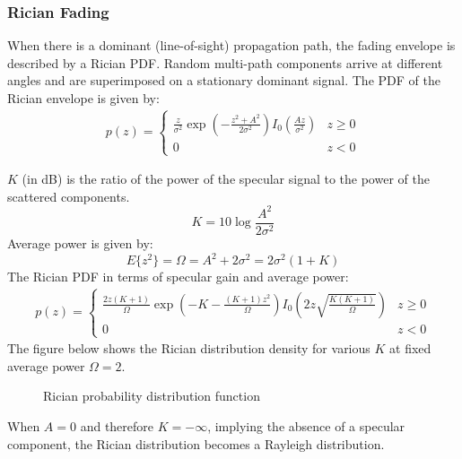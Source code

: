 \subsubsection{Rician Fading}
When there is a dominant (line-of-sight) propagation path, the fading envelope is described by a Rician \gls{PDF}\cite{AWGN}. Random multi-path components arrive at different angles and are superimposed on a stationary dominant signal. The \gls{PDF} of the Rician envelope is given by:
\begin{align}
	p(z) =
	\begin{cases}
		\frac{z}{\sigma^2} \exp \left(-\frac{z^2 + A^2}{2\sigma^2}\right)I_0\left(\frac{Az}{\sigma^2}\right) & z \geq 0 \\
		0 & z < 0
	\end{cases}
\end{align}
\begin{mathDef}
\end{mathDef}
\(K\) (in dB) is the ratio of the power of the specular signal to the power of the scattered components\cite{Hindu}.
\begin{equation}
	K = 10 \log \frac{A^2}{2\sigma^2}
\end{equation}
Average power is given by:
\begin{equation}
	E\{z^2\} = \Omega = A^2 + 2\sigma^2 = 2\sigma^2(1 + K)
\end{equation}
The Rician \gls{PDF} in terms of specular gain and average power:
\begin{align}
	p(z) =
	\begin{cases}
		\frac{2z(K+1)}{\Omega} \exp \left(-K-\frac{(K+1)z^2}{\Omega}\right)I_0\left(2z\sqrt{\frac{K(K+1)}{\Omega}}\right) & z \geq 0 \\
		0 & z < 0
	\end{cases}
\end{align}
The figure below shows the Rician distribution density for various \(K\) at fixed average power \(\Omega = 2\).
\begin{figure}[!h]
	\centering
	\resizebox{0.8\textwidth}{!}{}
	\caption{Rician probability distribution function}
\end{figure}

When \(A=0\) and therefore \(K=-\infty\), implying the absence of a specular component, the Rician distribution becomes a Rayleigh distribution.

